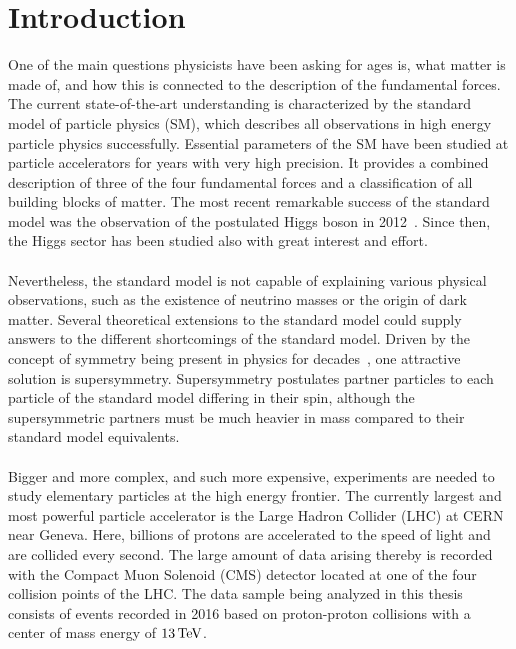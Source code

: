 \chapter{Introduction}\label{chap:intro}

One of the main questions physicists have been asking for ages is, what matter is made of, and how this is connected to the description of the fundamental forces.\\
The current state-of-the-art understanding is characterized by the standard model of particle physics (SM), which describes all observations in high energy particle physics successfully. Essential parameters of the SM have been studied at particle accelerators for years with very high precision. It provides a combined description of three of the four fundamental forces and a classification of all building blocks of matter. The most recent remarkable success of the standard model was the observation of the postulated Higgs boson in 2012~\cite{HiggsCMS,HiggsATLAS,HiggsCombined}. Since then, the Higgs sector has been studied also with great interest and effort.\\\\
Nevertheless, the standard model is not capable of explaining various physical observations, such as the existence of neutrino masses or the origin of dark matter. Several theoretical extensions to the standard model could supply answers to the different shortcomings of the standard model. Driven by the concept of symmetry being present in physics for decades~\cite{Noether}, one attractive solution is supersymmetry. Supersymmetry postulates partner particles to each particle of the standard model differing in their spin, although the supersymmetric partners must be much heavier in mass compared to their standard model equivalents.\\\\
Bigger and more complex, and such more expensive, experiments are needed to study elementary particles at the high energy frontier. The currently largest and most powerful particle accelerator is the Large Hadron Collider (LHC) at CERN near Geneva. Here, billions of protons are accelerated to the speed of light and are collided every second. The large amount of data arising thereby is recorded with the Compact Muon Solenoid (CMS) detector located at one of the four collision points of the LHC. The data sample being analyzed in this thesis consists of events recorded in 2016 based on proton-proton collisions with a center of mass energy of $13\,\text{Te\hspace{-.08em}V}$.\\\\
